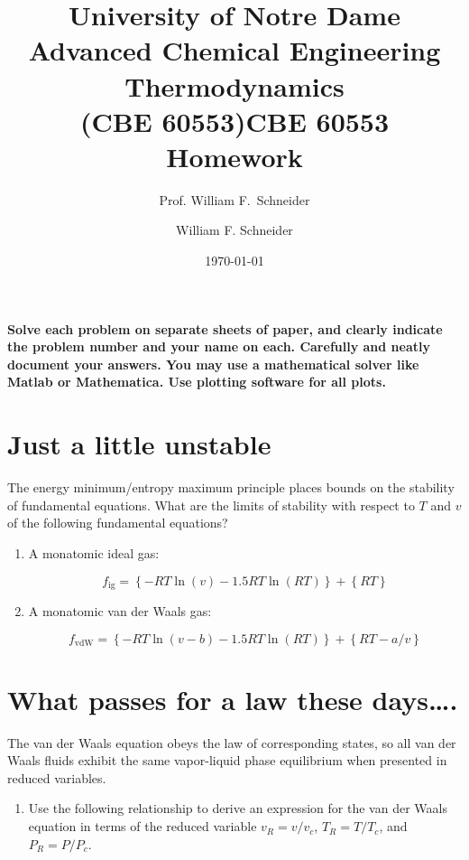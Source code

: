 \documentclass[11pt]{article}
\title{University of Notre Dame\\Advanced Chemical Engineering Thermodynamics\\(CBE 60553)}
\author{Prof. William F.\ Schneider}
\author{William F. Schneider}
\date{\today}
\title{CBE 60553 Homework}
\begin{document}
\begin{OPTIONS}
\end{OPTIONS}

\noindent \textbf{Solve each problem on separate sheets of paper, and clearly indicate the problem number and your name on each.  Carefully and neatly document your answers.  You may use a mathematical solver like Matlab or Mathematica. Use plotting software for all plots.}

\section{Just a little unstable}
\label{sec:org1ed2792}
The energy minimum/entropy maximum principle places bounds on the stability of fundamental equations.  What are the limits of stability with respect to \(T\) and \(v\) of the following fundamental equations?

\begin{enumerate}
\item A monatomic ideal gas:

\begin{equation*}
 f_\text{ig} = \left \{ - RT \ln (v) -1.5 R T \ln (R T) \right\} +\left \{ RT \right \}
\end{equation*}

\item A monatomic van der Waals gas:

\begin{equation*}
  f_\text{vdW} = \left \{ - RT \ln (v-b) -1.5 R T \ln (R T) \right\} +\left \{ RT -a/v
  \right \}
  \end{equation*}
\end{enumerate}

\section{What passes for a law these days\ldots{}.}
\label{sec:org1f85da1}
The van der Waals equation obeys
  the law of corresponding states, so all van der Waals fluids exhibit the same
  vapor-liquid phase equilibrium when presented in reduced variables.

\begin{enumerate}
\item Use the following relationship to derive an expression for the van der Waals
equation in terms of the reduced variable \(v_R = v/v_c\), \(T_R = T/T_c\), and
\(P_R = P/P_c\).
\end{enumerate}
\end{document}
